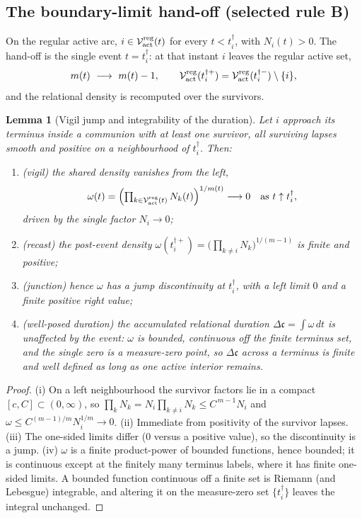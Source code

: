 \documentclass[11pt,a4paper]{article}
\theoremstyle{definition}
\theoremstyle{plain}
\newtheorem{lemma}[definition]{Lemma}
\theoremstyle{remark}
\begin{document}
\subsection{The boundary-limit hand-off (selected rule B)}

On the regular active arc, \(i\in\mathcal V_{\rm act}^{\rm reg}(t)\) for every
\(t<t_i^\dagger\), with \(N_i(t)>0\). The hand-off is the single event
\(t=t_i^\dagger\): at that instant \(i\) leaves the regular active set,
\[
m(t)\ \longrightarrow\ m(t)-1,
\qquad
\mathcal V_{\rm act}^{\rm reg}(t_i^{\dagger+})
=\mathcal V_{\rm act}^{\rm reg}(t_i^{\dagger-})\setminus\{i\},
\]
and the relational density is recomputed over the survivors.

\begin{lemma}[Vigil jump and integrability of the duration]\label{lem:handoff}
Let \(i\) approach its terminus inside a communion with at least one survivor, all
surviving lapses smooth and positive on a neighbourhood of \(t_i^\dagger\). Then:
\begin{enumerate}[label=\textup{(\roman*)},leftmargin=1.2cm]
\item \emph{(vigil)} the shared density vanishes from the left,
\[
\omega(t)=\Bigl(\textstyle\prod_{k\in\mathcal V_{\rm act}^{\rm reg}(t)}N_k(t)\Bigr)^{1/m(t)}
\longrightarrow0
\quad\text{as }t\uparrow t_i^\dagger,
\]
driven by the single factor \(N_i\to0\);
\item \emph{(recast)} the post-event density
\(\omega(t_i^{\dagger+})=\bigl(\prod_{k\neq i}N_k\bigr)^{1/(m-1)}\) is finite and
positive;
\item \emph{(junction)} hence \(\omega\) has a jump discontinuity at \(t_i^\dagger\),
with a left limit \(0\) and a finite positive right value;
\item \emph{(well-posed duration)} the accumulated relational duration
\(\Delta\mathfrak c=\int\omega\,dt\) is unaffected by the event: \(\omega\) is bounded,
continuous off the finite terminus set, and the single zero is a measure-zero point, so
\(\Delta\mathfrak c\) across a terminus is finite and well defined as long as one active
interior remains.
\end{enumerate}
\end{lemma}
\begin{proof}
(i) On a left neighbourhood the survivor factors lie in a compact
\([c,C]\subset(0,\infty)\), so \(\prod_k N_k=N_i\prod_{k\neq i}N_k\le C^{\,m-1}N_i\) and
\(\omega\le C^{(m-1)/m}N_i^{1/m}\to0\). (ii) Immediate from positivity of the survivor
lapses. (iii) The one-sided limits differ (\(0\) versus a positive value), so the
discontinuity is a jump. (iv) \(\omega\) is a finite product-power of bounded functions,
hence bounded; it is continuous except at the finitely many terminus labels, where it
has finite one-sided limits. A bounded function continuous off a finite set is Riemann
(and Lebesgue) integrable, and altering it on the measure-zero set \(\{t_i^\dagger\}\)
leaves the integral unchanged. \qedhere
\end{proof}
\end{document}
